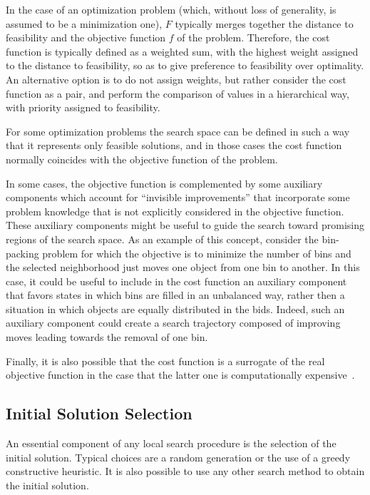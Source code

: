 In the case of an optimization problem (which, without loss of
generality, is assumed to be a minimization one), $F$ typically merges
together the distance to feasibility and the objective function $f$ of
the problem.  Therefore, the cost function is typically defined as a
weighted sum, with the highest weight assigned to the distance to
feasibility, so as to give preference to feasibility over
optimality. %
%
An alternative option is to do not assign weights, but rather consider
the cost function as a pair, and perform the comparison of values in a
hierarchical way, with priority assigned to feasibility.

For some optimization problems the search space can be defined in such
a way that it represents only feasible solutions, and in those cases the cost
function normally coincides with the objective function of the problem.

In some cases, the objective function is complemented by some
auxiliary components which account for ``invisible improvements'' that
incorporate some problem knowledge that is not explicitly considered
in the objective function.  These auxiliary components might be useful
to guide the search toward promising regions of the search space.
As an example of this concept, consider the bin-packing problem for
which the objective is to minimize the number of bins and the selected
neighborhood just moves one object from one bin to another. In this
case, it could be useful to include in the cost function an auxiliary
component that favors states in which bins are filled in an unbalanced
way, rather then a situation in which objects are equally distributed
in the bids. Indeed, such an auxiliary component could create a search
trajectory composed of improving moves leading towards the removal of
one bin. %

Finally, it is also possible that the cost function is a surrogate of
the real objective function in the case that the latter one is
computationally expensive~\cite{KoCL11}.

\subsection{Initial Solution Selection}

An essential component of any local search procedure is the selection of
the initial solution. Typical choices are a random
generation or the use of a greedy constructive heuristic. It is also possible to use any
other search method to obtain the initial solution.

